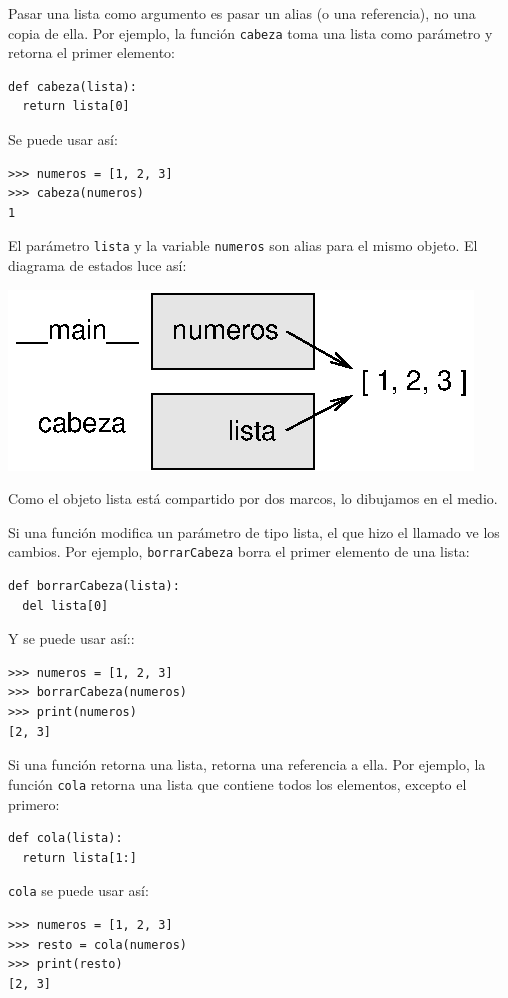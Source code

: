 Pasar una lista como argumento es pasar un alias (o una referencia),
no una copia de ella. Por ejemplo, la función \texttt{cabeza} toma
una lista como parámetro y retorna el primer elemento:
\begin{verbatim}
def cabeza(lista):
  return lista[0]
\end{verbatim}

Se puede usar así:
\begin{verbatim}
>>> numeros = [1, 2, 3]
>>> cabeza(numeros)
1
\end{verbatim}

El parámetro \texttt{lista} y la variable \texttt{numeros} son alias
para el mismo objeto. El diagrama de estados luce así:

\beforefig \centerline{\includegraphics{illustrations/stack5}}
\afterfig

Como el objeto lista está compartido por dos marcos, lo dibujamos
en el medio.

Si una función modifica un parámetro de tipo lista, el que hizo el
llamado ve los cambios. Por ejemplo, \texttt{borrarCabeza} borra el
primer elemento de una lista:
\begin{verbatim}
def borrarCabeza(lista):
  del lista[0]
\end{verbatim}

Y se puede usar así::
\begin{verbatim}
>>> numeros = [1, 2, 3]
>>> borrarCabeza(numeros)
>>> print(numeros)
[2, 3]
\end{verbatim}

Si una función retorna una lista, retorna una referencia a ella. Por
ejemplo, la función \texttt{cola} retorna una lista que contiene todos
los elementos, excepto el primero:
\begin{verbatim}
def cola(lista):
  return lista[1:]
\end{verbatim}

\texttt{cola} se puede usar así:
\begin{verbatim}
>>> numeros = [1, 2, 3]
>>> resto = cola(numeros)
>>> print(resto)
[2, 3]
\end{verbatim}

